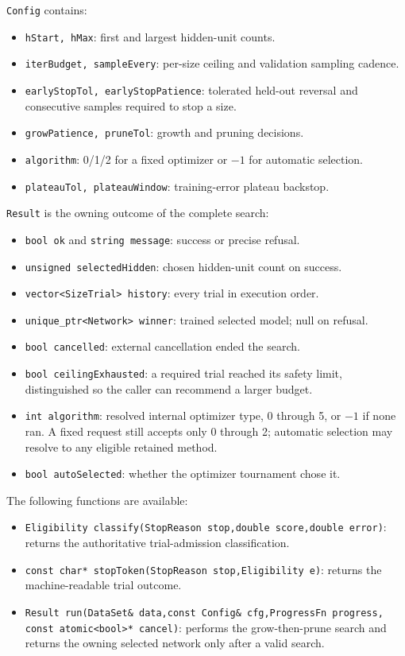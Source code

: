 \texttt{Config} contains:

\begin{itemize}
\item \texttt{hStart, hMax}: first and largest hidden-unit counts.
\item \texttt{iterBudget, sampleEvery}: per-size ceiling and validation sampling
      cadence.
\item \texttt{earlyStopTol, earlyStopPatience}: tolerated held-out reversal and
      consecutive samples required to stop a size.
\item \texttt{growPatience, pruneTol}: growth and pruning decisions.
\item \texttt{algorithm}: 0/1/2 for a fixed optimizer or $-1$ for automatic
      selection.
\item \texttt{plateauTol, plateauWindow}: training-error plateau backstop.
\end{itemize}

\texttt{Result} is the owning outcome of the complete search:

\begin{itemize}
\item \texttt{bool ok} and \texttt{string message}: success or precise refusal.
\item \texttt{unsigned selectedHidden}: chosen hidden-unit count on success.
\item \texttt{vector<SizeTrial> history}: every trial in execution order.
\item \texttt{unique\_ptr<Network> winner}: trained selected model; null on refusal.
\item \texttt{bool cancelled}: external cancellation ended the search.
\item \texttt{bool ceilingExhausted}: a required trial reached its safety limit,
      distinguished so the caller can recommend a larger budget.
\item \texttt{int algorithm}: resolved internal optimizer type, 0 through 5,
      or $-1$ if none ran. A fixed request still accepts only 0 through 2;
      automatic selection may resolve to any eligible retained method.
\item \texttt{bool autoSelected}: whether the optimizer tournament chose it.
\end{itemize}

The following functions are available:

\begin{itemize}
\item \texttt{Eligibility classify(StopReason stop,double score,double error)}:
      returns the authoritative trial-admission classification.
\item \texttt{const char* stopToken(StopReason stop,Eligibility e)}: returns the
      machine-readable trial outcome.
\item \texttt{Result run(DataSet\& data,const Config\& cfg,ProgressFn progress,
      const atomic<bool>* cancel)}: performs the grow-then-prune search and
      returns the owning selected network only after a valid search.
\end{itemize}

